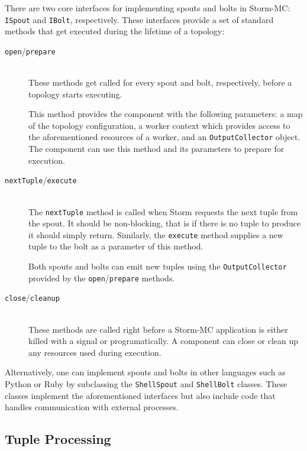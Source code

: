 There are two core interfaces for implementing spouts and bolts in Storm-MC: \texttt{ISpout} and \texttt{IBolt}, respectively. These interfaces provide a set of standard methods that get executed during the lifetime of a topology:

\begin{description}
	\item[\texttt{open}/\texttt{prepare}] \hfill \\
	These methods get called for every spout and bolt, respectively, before a topology starts executing.

	This method provides the component with the following parameters: a map of the topology configuration, a worker context which provides access to the aforementioned resources of a worker, and an \texttt{OutputCollector} object. The component can use this method and its parameters to prepare for execution.

	\item[\texttt{nextTuple}/\texttt{execute}] \hfill \\
	The \texttt{nextTuple} method is called when Storm requests the next tuple from the spout. It should be non-blocking, that is if there is no tuple to produce it should simply return. Similarly, the \texttt{execute} method supplies a new tuple to the bolt as a parameter of this method.

	Both spouts and bolts can emit new tuples using the \texttt{OutputCollector} provided by the \texttt{open}/\texttt{prepare} methods.

	\item[\texttt{close}/\texttt{cleanup}] \hfill \\
	These methods are called right before a Storm-MC application is either killed with a signal or programatically. A component can close or clean up any resources used during execution.
\end{description}

Alternatively, one can implement spouts and bolts in other languages such as Python or Ruby by subclassing the \texttt{ShellSpout} and \texttt{ShellBolt} classes. These classes implement the aforementioned interfaces but also include code that handles communication with external processes.

\subsection{Tuple Processing}

